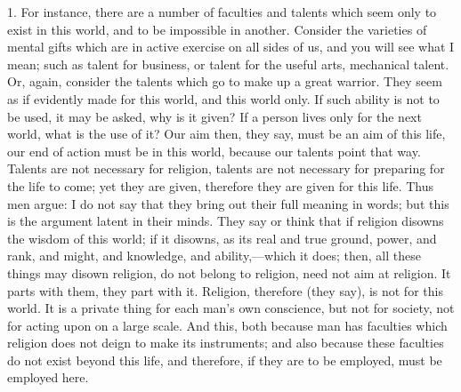 1. For instance, there are a number of faculties and talents which
seem only to exist in this world, and to be impossible in another.
Consider the varieties of mental gifts which are in active exercise on
all sides of us, and you will see what I mean; such as talent for
business, or talent for the useful arts, mechanical talent. Or, again,
consider the talents which go to make up a great warrior. They seem as
if evidently made for this world, and this world only. If such ability
is not to be used, it may be asked, why is it given? If a person lives
only for the next world, what is the use of it? Our aim then, they
say, must be an aim of this life, our end of action must be in this
world, because our talents point that way. Talents are not necessary
for religion, talents are not necessary for preparing for the life to
come; yet they are given, therefore they are given for this life. Thus
men argue: I do not say that they bring out their full meaning in
words; but this is the argument latent in their minds. They say or
think that if religion disowns the wisdom of this world; if it
disowns, as its real and true ground, power, and rank, and might, and
knowledge, and ability,—which it does; then, all these things may
disown religion, do not belong to religion, need not aim at religion.
It parts with them, they part with it. Religion, therefore (they say),
is not for this world. It is a private thing for each man's own
conscience, but not for society, not for acting upon on a large scale.
And this, both because man has faculties which religion does not deign
to make its instruments; and also because these faculties do not exist
beyond this life, and therefore, if they are to be employed, must be
employed here.

